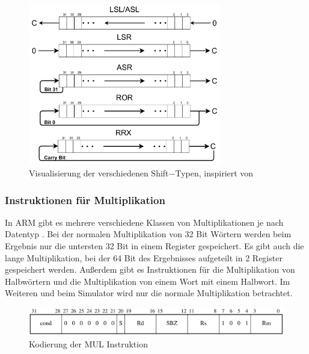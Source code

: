 \documentclass[a4paper, 11pt, onecolumn]{article}
\begin{document}
\begin{figure}[!htb]
\centering
\includegraphics[width=0.75\textwidth]{data/shift}
\caption[Verschiebe$-$ und Rotationsoperationen]{Visualisierung der verschiedenen Shift$-$Typen, inspiriert von \cite{assembly}}
\label{fig:shift}
\end{figure}

\subsubsection{Instruktionen für Multiplikation}

In ARM gibt es mehrere verschiedene Klassen von Multiplikationen je nach Datentyp \cite{arm:2005}. Bei der normalen Multiplikation von 32 Bit Wörtern werden beim Ergebnis nur die untersten 32 Bit in einem Register gespeichert. Es gibt auch die lange Multiplikation, bei der 64 Bit des Ergebnisses aufgeteilt in 2 Register gespeichert werden. Außerdem gibt es Instruktionen für die  Multiplikation von Halbwörtern und die Multiplikation von einem Wort mit einem Halbwort. Im Weiteren und beim Simulator wird nur die normale Multiplikation betrachtet.

\begin{figure}[!htb]
\centering
\includegraphics[width=1\textwidth]{data/mul}
\caption[Kodierung MUL]{Kodierung der MUL Instruktion \cite{arm:2005}}
\label{fig:mul}
\end{figure}
\end{document}
